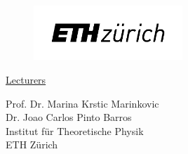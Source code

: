 \begin{titlepage}
\begin{center}
        \vspace{1cm}
        
        \begin{figure}[h]
            \centering
            \includegraphics[width=0.5\textwidth]{Images/eth_logo.png}
        \end{figure}
    
    	\vfill
    	
	    \large
		\underline{Lecturers}
	
		\vspace{1mm}
		Prof. Dr. Marina Krstic Marinkovic\\
		Dr. Joao Carlos Pinto Barros\\
		
		\vspace{1cm}
        \small
        Institut für Theoretische Physik\\
        ETH Zürich\\
        

    \end{center}


\end{titlepage}